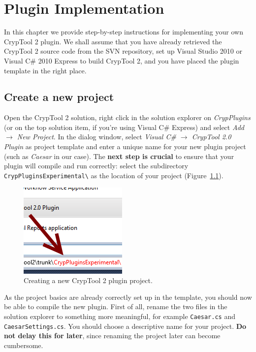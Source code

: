 \chapter{Plugin Implementation}
\label{sec:PluginImplementation}
In this chapter we provide step-by-step instructions for implementing your own CrypTool 2 plugin. We shall assume that you have already retrieved the CrypTool 2 source code from the SVN repository, set up Visual Studio 2010 or Visual C\# 2010 Express to build CrypTool 2, and you have placed the plugin template in the right place.

\section{Create a new project}
\label{sec:CreatingANewProject}

Open the CrypTool 2 solution, right click in the solution explorer on \textit{CrypPlugins} (or on the top solution item, if you're using Visual C\# Express) and select \textit{Add~$\rightarrow$ New Project}. In the dialog window, select \textit{Visual C\# $\rightarrow$ CrypTool 2.0 Plugin} as project template and enter a unique name for your new plugin project (such as \textit{Caesar} in our case). The \textbf{next step is crucial} to ensure that your plugin will compile and run correctly: select the subdirectory \texttt{CrypPluginsExperimental\textbackslash} as the location of your project (Figure~\ref{fig:vs_create_new_project}).

\begin{figure}[h!]
	\centering
		\includegraphics{figures/vs_create_new_project.png}
	\caption{Creating a new CrypTool 2 plugin project.}
	\label{fig:vs_create_new_project}
\end{figure}

As the project basics are already correctly set up in the template, you should now be able to compile the new plugin. First of all, rename the two files in the solution explorer to something more meaningful, for example \texttt{Caesar.cs} and \texttt{CaesarSettings.cs}. You should choose a descriptive name for your project. \textbf{Do not delay this for later}, since renaming the project later can become cumbersome.

